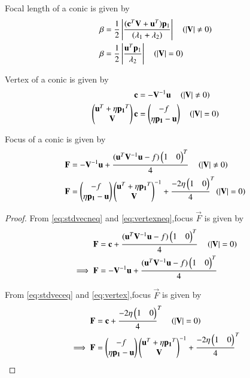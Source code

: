 \documentclass[journal,12pt,twocolumn]{IEEEtran}
\begin{document}
\begin{lemma}
Focal length of a conic is given by
\begin{align}
\beta &= \frac{1}{2}\left\vert\frac{(\mathbf{c}^T\mathbf{V}+\mathbf{u}^T)\mathbf{p}_1}{(\lambda_1+\lambda_2)}\right\vert \quad \left(\left\vert\mathbf{V}\right\vert \neq 0\right) \label{eq:foclenneq}
\\
\beta &= \frac{1}{2}\left\vert\frac{\mathbf{u}^T\mathbf{p}_1}{\lambda_2}\right\vert \quad \left(\left\vert\mathbf{V}\right\vert = 0\right) \label{eq:foclen} \end{align}
\end{lemma}

\begin{lemma}
Vertex of a conic is given by 
\begin{align}
\mathbf{c} &= -\mathbf{V}^{-1}\mathbf{u} \quad \left(\left\vert\mathbf{V}\right\vert \neq 0\right) \label{eq:vertexneq}
\\
\begin{pmatrix}\mathbf{u}^T + \eta\mathbf{p_1}^T \\ \mathbf{V}\end{pmatrix}\mathbf{c} &= \begin{pmatrix}-f \\ \eta\mathbf{p_1} - \mathbf{u}\end{pmatrix} \quad \left(\left\vert\mathbf{V}\right\vert = 0\right) \label{eq:vertex}
\end{align}
\end{lemma}

\begin{lemma}
Focus of a conic is given by 
\begin{align}
\mathbf{F} &= -\mathbf{V}^{-1}\mathbf{u} + \frac{(\mathbf{u}^T\mathbf{V}^{-1}\mathbf{u} - f)\begin{pmatrix}1 & 0\end{pmatrix}^T}{4} \quad \left(\left\vert\mathbf{V}\right\vert \neq 0\right)
\\
\mathbf{F} &= \begin{pmatrix}-f \\ \eta\mathbf{p_1} - \mathbf{u}\end{pmatrix}{\ensuremath{\begin{pmatrix}\mathbf{u}^T + \eta\mathbf{p_1}^T \\ \mathbf{V}\end{pmatrix}}}^{-1}+{\frac{-2\eta\begin{pmatrix}1 & 0\end{pmatrix}}{4}}^{T} \left(\left\vert\mathbf{V}\right\vert = 0\right) \label{eq:focus}
\end{align}
\end{lemma}

\begin{proof}
From \eqref{eq:stdvecneq} and \eqref{eq:vertexneq},focus $\vec{F}$ is given by
\begin{align}
\mathbf{F} &= \mathbf{c} + \frac{(\mathbf{u}^T\mathbf{V}^{-1}\mathbf{u} - f)\begin{pmatrix}1 & 0\end{pmatrix}^T}{4} \quad \left(\left\vert\mathbf{V}\right\vert = 0\right)\\
\implies \mathbf{F} &= -\mathbf{V}^{-1}\mathbf{u} + \frac{(\mathbf{u}^T\mathbf{V}^{-1}\mathbf{u} - f)\begin{pmatrix}1 & 0\end{pmatrix}^T}{4} 
\end{align}

From \eqref{eq:stdveceq} and \eqref{eq:vertex},focus $\vec{F}$ is given by
\begin{align}
\mathbf{F} &= \mathbf{c} + {\frac{-2\eta\begin{pmatrix}1 & 0\end{pmatrix}}{4}}^{T} \quad \left(\left\vert\mathbf{V}\right\vert = 0\right)\\
\implies \mathbf{F} &= \begin{pmatrix}-f \\ \eta\mathbf{p_1} - \mathbf{u}\end{pmatrix}{\ensuremath{\begin{pmatrix}\mathbf{u}^T + \eta\mathbf{p_1}^T \\ \mathbf{V}\end{pmatrix}}}^{-1} + {\frac{-2\eta\begin{pmatrix}1 & 0\end{pmatrix}}{4}}^{T}
\end{align}
\end{proof}
\end{document}
